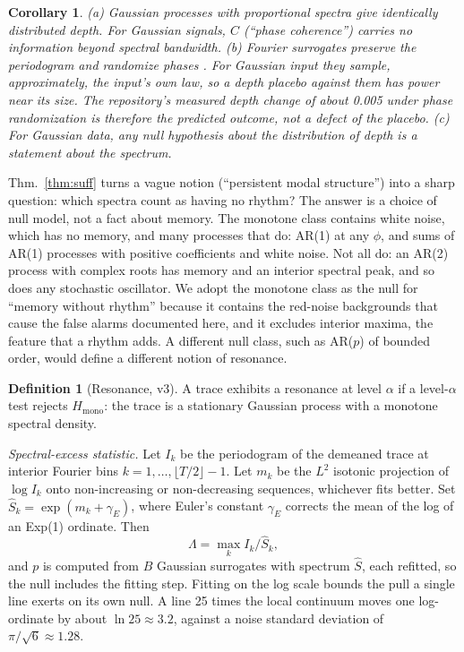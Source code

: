 \documentclass[10pt,twocolumn,letterpaper]{article}
\newtheorem{corollary}{Corollary}
\theoremstyle{definition}
\newtheorem{definition}{Definition}
\theoremstyle{remark}
\begin{document}
\begin{corollary}\label{cor:suff}
(a) Gaussian processes with proportional spectra give identically distributed
depth. For Gaussian signals, $C$ (``phase coherence'') carries no information
beyond spectral bandwidth. (b) Fourier surrogates preserve the periodogram and
randomize phases \cite{theiler}. For Gaussian input they sample, approximately,
the input's own law, so a depth placebo against them has power near its size.
The repository's measured depth change of about 0.005 under phase
randomization \cite{drr} is therefore the predicted outcome, not a defect of
the placebo. (c) For Gaussian data, any null hypothesis about the distribution of depth is
a statement about the spectrum.
\end{corollary}

Thm.~\ref{thm:suff} turns a vague notion (``persistent modal structure'') into
a sharp question: which spectra count as having no rhythm? The answer is a
choice of null model, not a fact about memory. The monotone class contains white
noise, which has no memory, and many processes that do: AR(1) at any $\phi$, and
sums of AR(1) processes with positive coefficients and white noise. Not all do: an AR(2)
process with complex roots has memory and an interior spectral peak, and so does
any stochastic oscillator. We adopt the monotone class as the null for
``memory without rhythm'' because it contains the red-noise backgrounds that
cause the false alarms documented here, and it excludes interior maxima, the
feature that a rhythm adds. A different null class, such as AR($p$) of bounded
order, would define a different notion of resonance.

\begin{definition}[Resonance, v3]\label{def:res}
A trace exhibits a resonance at level $\alpha$ if a level-$\alpha$ test rejects
$H_{\mathrm{mono}}$: the trace is a stationary Gaussian process with a monotone
spectral density.
\end{definition}

\textit{Spectral-excess statistic.} Let $I_k$ be the periodogram of the demeaned
trace at interior Fourier bins $k=1,\dots,\lfloor T/2\rfloor-1$. Let $m_k$ be
the $L^2$ isotonic projection of $\log I_k$ onto non-increasing or
non-decreasing sequences, whichever fits better. Set
$\hat S_k=\exp(m_k+\gamma_E)$, where Euler's constant $\gamma_E$ corrects the
mean of the log of an Exp(1) ordinate. Then
\begin{equation}\label{eq:lambda}
\Lambda=\max_k I_k/\hat S_k,
\end{equation}
and $p$ is computed from $B$ Gaussian surrogates with spectrum $\hat S$, each
refitted, so the null includes the fitting step. Fitting on the log scale
bounds the pull a single line exerts on its own null. A line 25 times the local
continuum moves one log-ordinate by about $\ln 25\approx3.2$, against a noise
standard deviation of $\pi/\sqrt6\approx1.28$.
\end{document}
